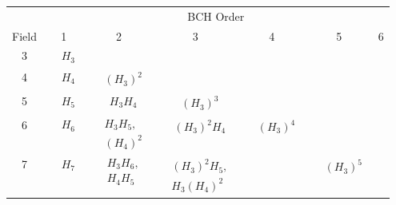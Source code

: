 \begin{table}[H]
  \centering
  \footnotesize
  \def\arraystretch{1.7}    %
  \setlength\tabcolsep{3pt} %
  \begin{tabular}{ccccccc}
  \multicolumn{1}{c}{} & \multicolumn{6}{c}{BCH Order} \\
  Field & 1 & 2 & 3 & 4 & 5 & 6 \\
  \midrule
  3 & $\begin{aligned}&H_{3}\end{aligned}$ &  &  &  &  &  \\
  \hline
  4 & $\begin{aligned}&H_{4}\end{aligned}$ & $\begin{aligned}&(H_{3})^2\end{aligned}$ &  &  &  &  \\
  \hline
  5 & $\begin{aligned}&H_{5}\end{aligned}$ & $\begin{aligned}&H_{3}H_{4}\end{aligned}$ & $\begin{aligned}&(H_{3})^3\end{aligned}$ &  &  &  \\
  \hline
  6 & $\begin{aligned}&H_{6}\end{aligned}$ & $\begin{aligned}&H_{3}H_{5},\\&(H_{4})^2\end{aligned}$ & $\begin{aligned}&(H_{3})^2H_{4}\end{aligned}$ & $\begin{aligned}&(H_{3})^4\end{aligned}$ &  &  \\
  \hline
  7 & $\begin{aligned}&H_{7}\end{aligned}$ & $\begin{aligned}&H_{3}H_{6},\\&H_{4}H_{5}\end{aligned}$ & $\begin{aligned}&(H_{3})^2H_{5},\\&H_{3}(H_{4})^2\end{aligned}$ &  & $\begin{aligned}&(H_{3})^5\end{aligned}$ &  \\

\end{tabular}
\end{table}
